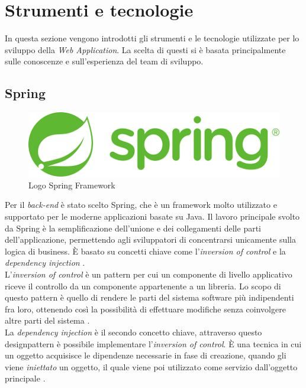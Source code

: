 \chapter{Strumenti e tecnologie}
\label{chap:strumenti}

In questa sezione vengono introdotti gli strumenti e le tecnologie utilizzate per lo sviluppo della \textit{Web Application}. La scelta di questi si è basata principalmente sulle conoscenze e sull'esperienza del team di sviluppo. 

\section{Spring}

\begin{figure}
\begin{center}
\includegraphics[width=0.5\columnwidth]{images/springlogo.png}
\end{center}
\caption{Logo Spring Framework}
\label{fig:springf}
\end{figure}

Per il \textit{back-end} è stato scelto Spring, che è un \gls{framework} molto utilizzato e supportato per le
moderne applicazioni basate su Java. Il lavoro principale svolto da Spring è la semplificazione dell'unione e dei collegamenti delle parti dell'applicazione, permettendo agli sviluppatori di concentrarsi unicamente sulla logica di business. È basato su
concetti chiave come l’\textit{inversion of control} e la \textit{dependency injection} \cite{spring}.\\

L'\textit{inversion of control} è un pattern per cui un componente di livello applicativo riceve il controllo da un componente appartenente a un libreria. Lo scopo di questo pattern è quello di rendere le parti del sistema software più indipendenti fra loro, ottenendo così la possibilità di effettuare modifiche senza coinvolgere altre parti del sistema \cite{ioc} \cite{baeldung}. \\

La \textit{dependency injection} è il secondo concetto chiave, attraverso questo \gls{designpattern} è possibile implementare l'\textit{inversion of control}. È una tecnica in cui un oggetto acquisisce le dipendenze necessarie in fase di creazione, quando gli viene \textit{iniettato} un oggetto,
il quale viene poi utilizzato come servizio dall’oggetto principale \cite{depinj} \cite{baeldung}.



